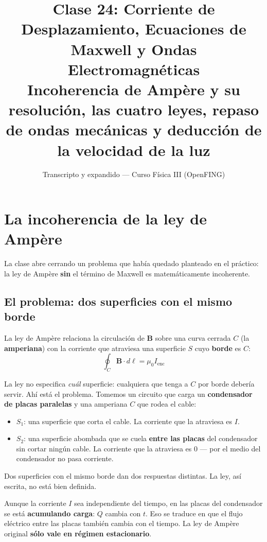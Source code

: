 \documentclass[12pt,a4paper]{article}
\title{\textbf{Clase 24: Corriente de Desplazamiento, Ecuaciones de Maxwell
        y Ondas Electromagnéticas}\\[0.3em]
        \large{Incoherencia de Ampère y su resolución, las cuatro leyes,
              repaso de ondas mecánicas y deducción de la velocidad de la luz}}
\author{Transcripto y expandido --- Curso Física III (OpenFING)}
\date{}
\begin{document}
\maketitle
\thispagestyle{empty}
\newpage

\tableofcontents
\newpage

\section{La incoherencia de la ley de Ampère}

La clase abre cerrando un problema que había quedado planteado en el
práctico: la ley de Ampère \textbf{sin} el término de Maxwell es
matemáticamente incoherente.

\subsection{El problema: dos superficies con el mismo borde}

La ley de Ampère relaciona la circulación de $\mathbf{B}$ sobre una curva
cerrada $C$ (la \textbf{amperiana}) con la corriente que atraviesa una
superficie $S$ cuyo \textbf{borde} es $C$:
\[
\oint_C \mathbf{B}\cdot d\boldsymbol{\ell} = \mu_0 I_{\text{enc}}
\]

La ley no especifica \emph{cuál} superficie: cualquiera que tenga a $C$ por
borde debería servir. Ahí está el problema. Tomemos un circuito que carga un
\textbf{condensador de placas paralelas} y una amperiana $C$ que rodea el
cable:

\begin{itemize}
  \item \textbf{$S_1$}: una superficie que corta el cable. La corriente que
        la atraviesa es $I$.
  \item \textbf{$S_2$}: una superficie abombada que se cuela \textbf{entre
        las placas} del condensador sin cortar ningún cable. La corriente
        que la atraviesa es $0$ --- por el medio del condensador no pasa
        corriente.
\end{itemize}

Dos superficies con el mismo borde dan dos respuestas distintas. La ley, así
escrita, no está bien definida.

\begin{warnbox}
Aunque la corriente $I$ sea independiente del tiempo, en las placas del
condensador se está \textbf{acumulando carga}: $Q$ cambia con $t$. Eso se
traduce en que el flujo eléctrico entre las placas también cambia con el
tiempo. La ley de Ampère original \textbf{sólo vale en régimen
estacionario}.
\end{warnbox}
\end{document}

